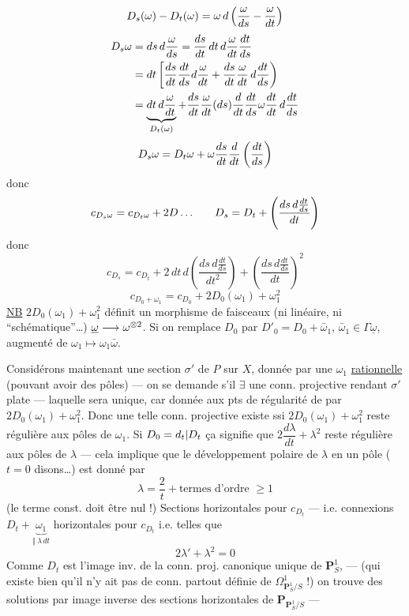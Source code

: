 \[
{D_s(\omega)-D_t(\omega)=\omega\,d\left(\frac\omega{ds}-\frac\omega{dt}\right)}
\]
\[
\begin{aligned}
D_s\omega&=ds\,d\frac\omega{ds}=\frac{ds}{dt}\,dt\,d\frac\omega{dt}\frac{dt}{ds}\\
&=dt\left[{\frac{ds}{dt}\frac{dt}{ds}}d\frac\omega{dt}
+\frac{ds}{dt}\frac\omega{dt}\,d\frac{dt}{ds}\right)\\
&=\underbrace{dt\,d\frac\omega{dt}}_{D_t(\omega)}
+{{\frac{ds}{dt}\frac\omega{dt}(ds)\frac d{dt}\frac{dt}{ds}}}\omega\frac{{dt}}{dt}\,d\frac{dt}{ds}
\end{aligned}
\]
\[
D_s\omega=D_t\omega+\omega\frac{ds}{{dt}}\frac d{dt}\left(\frac{dt}{ds}\right)
\]
donc
\[
{c_{D_s{\omega}}=c_{D_t{\omega}}+2D\ldots}
\qquad D_s=D_t+\left(\frac{ds\,d\frac{dt}{ds}}{dt}\right)
\]
donc
\[
c_{D_s}=c_{D_t}+2\,dt\,d\left(\frac{ds\,d\frac{dt}{ds}}{dt^2}\right)
+\left(\frac{ds\,d\frac{dt}{ds}}{dt}\right)^2
\]
\[
c_{D_0+\omega_1}=c_{D_0}+2D_0(\omega_1)+\omega_1^2
\]
\uline{NB} \inserted{$\omega_1\longmapsto$} $2D_0(\omega_1)+\omega_1^2$ définit un morphisme de faisceaux (ni linéaire, ni ``schématique''\ldots) $\underline\omega\longrightarrow\omega^{{\otimes2}}$.
Si on remplace $D_0$ par $D'_0=D_0+\bar\omega_1$, $\bar\omega_1\in\Gamma\underline\omega$,  augmenté de $\omega_1\longmapsto\omega_1\bar\omega$.

Considérons maintenant une section $\sigma'$ de $P$ sur $X$, donnée  par une $\omega_1$ \uline{rationnelle} (pouvant avoir des pôles) --- on se demande s'il $\exists$ une conn. projective rendant $\sigma'$ plate --- laquelle sera unique, car donnée aux pts de régularité de  par $2D_0(\omega_1)+\omega_1^2$.
Donc une telle conn. projective existe ssi $2D_0(\omega_1)+\omega_1^2$ reste régulière aux pôles de $\omega_1$. Si $D_0={d_t|D_t}$  ça signifie que $2\dfrac{d\lambda}{dt}+\lambda^2$ reste régulière aux pôles de $\lambda$ --- cela implique que le développement polaire de $\lambda$ en un pôle ($t=0$ disons\ldots) est donné par
\[
\lambda=\frac2t+\text{termes d'ordre }\geq1
\]
(le terme const. doit être nul !)
Sections horizontales  pour $c_{D_t}$ --- i.e. connexions $D_t+\underbrace{\omega_1}_{\Vert\ \lambda\,dt}$ horizontales pour $c_{D_t}$ i.e. telles que
\[
2\lambda'+\lambda^2=0
\]
Comme $D_t$ est l'image inv.  de la conn. proj. canonique unique de $\mathbf P^1_S$, --- (qui existe bien qu'il n'y ait pas de conn. partout définie de $\Omega^1_{\mathbf P^1_S/S}$ !) on trouve des solutions par image inverse des sections  horizontales de $\mathbf P_{\mathbf P^1_S/S}$ ---

